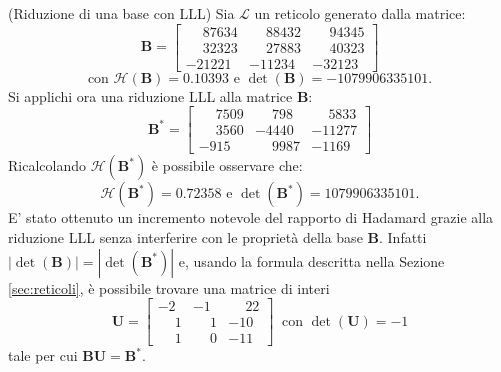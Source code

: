 \begin{exmp} (Riduzione di una base con LLL)
    Sia $\mathcal{L}$ un reticolo generato dalla matrice:
    \begin{equation*}
        \mathbf{B} =
        \begin{bmatrix*}
            \phantom{-}87634 & \phantom{-}88432 & \phantom{-}94345\\
            \phantom{-}32323 & \phantom{-}27883 & \phantom{-}40323\\
            -21221           & -11234           & -32123
        \end{bmatrix*}
    \end{equation*}
    \[
        \text{con } \mathcal{H}(\mathbf{B}) = 0.10393 \text{ e } \det(\mathbf{B}) = -1079906335101.
    \]
    Si applichi ora una riduzione LLL alla matrice $\mathbf{B}$:
    \begin{equation*}
        \mathbf{B}^* =
        \begin{bmatrix*}
            \phantom{-}7509 & \phantom{-}798  & \phantom{-}5833\\
            \phantom{-}3560 & -4440           & -11277\\
            -915            & \phantom{-}9987 & -1169
        \end{bmatrix*}
    \end{equation*}
    Ricalcolando $\mathcal{H}(\mathbf{B}^*)$ è possibile osservare che:
    \[
        \mathcal{H}(\mathbf{B}^*) = 0.72358 \text{ e }\det(\mathbf{B}^*) = 1079906335101.
    \]
    E' stato ottenuto un incremento notevole del rapporto di Hadamard grazie alla riduzione LLL senza 
    interferire con le proprietà della base $\mathbf{B}$. Infatti $|\det(\mathbf{B})| = |\det(\mathbf{B}^*)|$ e,
    usando la formula descritta nella Sezione \ref{sec:reticoli}, 
    è possibile trovare una matrice di interi
    \begin{equation*}
        \mathbf{U} =
        \begin{bmatrix*}
            -2           & -1              & \phantom{-}22\\
            \phantom{-}1 & \phantom{-}1    & -10\\
            \phantom{-}1 & \phantom{-}0    & -11
        \end{bmatrix*}
        \ \text{ con } \det(\mathbf{U}) = -1
    \end{equation*}
    tale per cui $\mathbf{B}\mathbf{U} = \mathbf{B}^*$.
\end{exmp}

